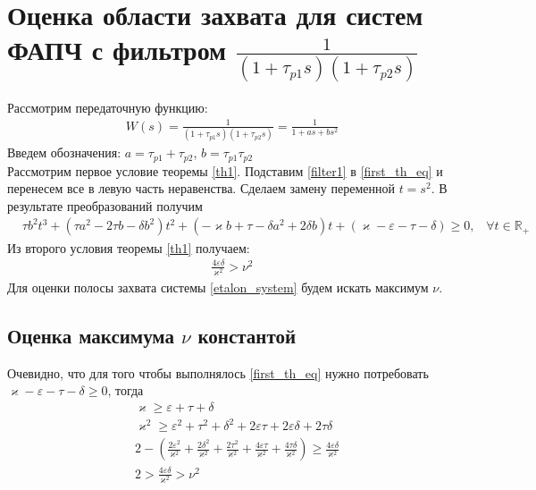 \documentclass[a4paper,14pt]{extarticle} %
\begin{document}
\newpage
\section{Оценка области захвата для систем ФАПЧ с фильтром $\frac{1}{(1+\tau_{p1}s)(1+\tau_{p2}s)}$}
 Рассмотрим передаточную функцию:
 \begin{equation}\label{filter1}
 \begin{aligned}
W(s) = \frac{1}{(1+\tau_{p1}s)(1+\tau_{p2}s)} = \frac{1}{1+as + bs^2}
 \end{aligned}
\end{equation}
Введем обозначения: $a = \tau_{p1}+\tau_{p2}$, $b = \tau_{p1}\tau_{p2}$\\
Рассмотрим первое условие теоремы \ref{th1}. Подставим \eqref{filter1} в \eqref{first_th_eq} и перенесем все в левую часть неравенства. Сделаем замену переменной $t = s^2$. В результате преобразований получим
\begin{equation}\label{first_condition}
 \begin{aligned}
&\tau b^2t^3 + (\tau a^2-2 \tau b - \delta b^2)t^2 + (-\varkappa b+\tau-\delta a^2 + 2\delta b)t + (\varkappa-\varepsilon-\tau-\delta) \geq 0 \text{,}\quad \forall t \in \mathbb{R_+}
 \end{aligned}
\end{equation}
Из второго условия теоремы \ref{th1} получаем: 
\begin{equation}
 \begin{aligned}
\frac{4\varepsilon\delta}{\varkappa^2} > \nu^2
 \end{aligned}
\end{equation}
Для оценки полосы захвата системы \eqref{etalon_system} будем искать максимум $\nu$.

\subsection{Оценка максимума $\nu$ константой}
Очевидно, что для того чтобы выполнялось \eqref{first_th_eq} нужно потребовать  $\varkappa - \varepsilon - \tau - \delta \geq 0$, тогда
\begin{equation}\label{const_ineq}
 \begin{aligned}
&\varkappa \geq \varepsilon+\tau+\delta \\
&\varkappa^2 \geq \varepsilon^2 + \tau^2 + \delta^2 + 2\varepsilon\tau + 2\varepsilon\delta + 2\tau\delta\\
&2 -(\frac{2\varepsilon^2}{\varkappa^2} + \frac{2\delta^2}{\varkappa^2} + \frac{2\tau^2}{\varkappa^2} +\frac{4\varepsilon\tau}{\varkappa^2} + \frac{4\tau\delta}{\varkappa^2}) \geq \frac{4\varepsilon\delta}{\varkappa^2}\\
&2 > \frac{4\varepsilon\delta}{\varkappa^2} > \nu^2
 \end{aligned}
\end{equation}
\end{document}
